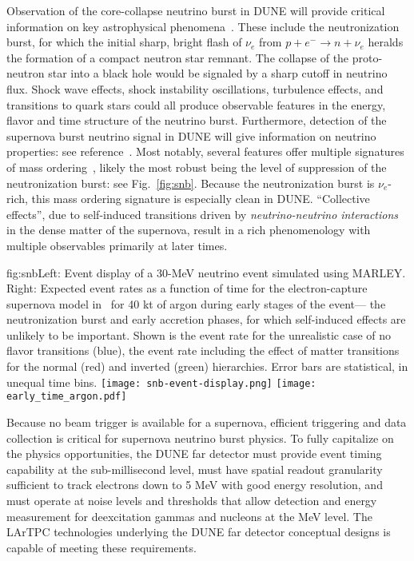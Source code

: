 Observation of the core-collapse neutrino burst in DUNE
will provide critical information on key
astrophysical phenomena~\cite{Mirizzi:2015eza}.  These include the neutronization burst, for which the initial sharp, bright flash
of $\nu_e$ from  $p+e^- \rightarrow n + \nu_e$
heralds the formation of a compact neutron star remnant.
The collapse of the proto-neutron star into a black hole would be signaled by a sharp cutoff in neutrino flux.
Shock wave effects, shock instability oscillations, turbulence effects, and transitions to quark stars could all produce observable features in the energy, flavor and time structure of the neutrino burst.
Furthermore, detection of the supernova burst 
neutrino signal in DUNE will give information on neutrino properties: see reference~\cite{Mirizzi:2015eza}.  Most notably, several features offer multiple signatures of mass ordering~\cite{Scholberg:2017czd}, likely the most robust being the level of suppression of the  neutronization burst: see Fig.~\ref{fig:snb}.  Because the neutronization burst is $\nu_e$-rich, this mass ordering signature is especially clean in DUNE.
``Collective effects'', due to self-induced transitions driven by \textit{neutrino-neutrino interactions} in the dense matter of the supernova, result in a rich phenomenology with multiple observables primarily at later times.  


\begin{dunefigure}{fig:snb}{Left: Event display of a 30-MeV neutrino event simulated using MARLEY. Right: Expected event rates as a function of time for the electron-capture supernova model in~\cite{Huedepohl:2009wh} for 40 kt of argon during early stages of the event--- the neutronization burst and early accretion phases, for which self-induced effects are unlikely to be important.  Shown is the event rate for the unrealistic case of no flavor transitions (blue), the event rate including the effect of matter transitions for the normal (red)  and inverted (green) hierarchies.  Error bars are statistical, in unequal time bins.}
\texttt{[image: snb-event-display.png]}
\texttt{[image: early\_time\_argon.pdf]}
\end{dunefigure}

Because no beam trigger is available for a supernova, efficient triggering and data collection is critical for supernova neutrino burst physics. To fully capitalize on the physics opportunities, the DUNE far detector must provide event timing capability at the sub-millisecond level, must have spatial readout granularity sufficient to track electrons down to 5 MeV with good energy resolution, and must operate at noise levels and thresholds that allow detection and energy measurement for deexcitation gammas and nucleons at the MeV level.  The LArTPC technologies underlying the DUNE far detector conceptual designs is capable of meeting these requirements.

